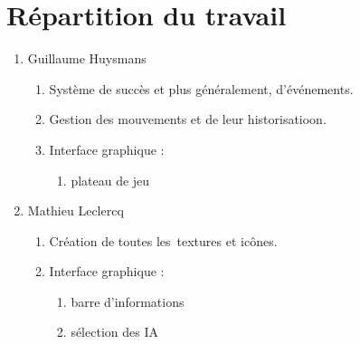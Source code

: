 \section{Répartition du travail}
\begin{enumerate}

\item Guillaume Huysmans
\begin{enumerate}
	\item Système de succès et plus généralement, d'événements.
    \item Gestion des mouvements et de leur historisatioon.
    \item Interface graphique :
    \begin{enumerate}
        \item plateau de jeu
    \end{enumerate}
\end{enumerate}

\item Mathieu Leclercq
\begin{enumerate}
	\item Création de toutes les~textures et icônes.
    \item Interface graphique : 
    \begin{enumerate}
        \item barre d'informations
        \item sélection des IA
    \end{enumerate}
\end{enumerate}

\end{enumerate}
